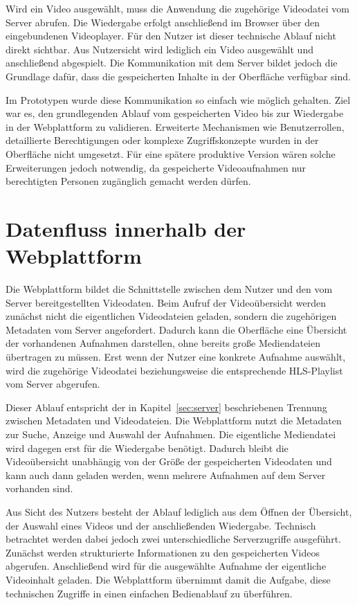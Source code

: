 Wird ein Video ausgewählt, muss die Anwendung die zugehörige Videodatei  vom Server abrufen. Die Wiedergabe erfolgt anschließend im Browser über den eingebundenen Videoplayer. Für den Nutzer ist dieser technische Ablauf nicht direkt sichtbar. 
Aus Nutzersicht wird lediglich ein Video ausgewählt und anschließend abgespielt. Die Kommunikation mit dem Server bildet jedoch die Grundlage dafür, dass die gespeicherten Inhalte in der Oberfläche verfügbar sind. 

Im Prototypen wurde diese Kommunikation so einfach wie möglich gehalten. Ziel war es, den grundlegenden Ablauf vom gespeicherten Video bis zur Wiedergabe in der Webplattform zu validieren. Erweiterte Mechanismen wie Benutzerrollen, 
detaillierte Berechtigungen oder komplexe Zugriffskonzepte wurden in der Oberfläche nicht umgesetzt. Für eine spätere produktive Version wären solche Erweiterungen jedoch notwendig, da gespeicherte Videoaufnahmen nur berechtigten Personen zugänglich gemacht werden dürfen.

\section{Datenfluss innerhalb der Webplattform} 

Die Webplattform bildet die Schnittstelle zwischen dem Nutzer und den vom Server bereitgestellten Videodaten. Beim Aufruf der Videoübersicht werden zunächst nicht die eigentlichen Videodateien geladen, sondern die zugehörigen Metadaten vom Server angefordert. 
Dadurch kann die Oberfläche eine Übersicht der vorhandenen Aufnahmen darstellen, ohne bereits große Mediendateien übertragen zu müssen. Erst wenn der Nutzer eine konkrete Aufnahme auswählt, wird die zugehörige Videodatei beziehungsweise die entsprechende \ac{HLS}-Playlist vom Server abgerufen. 

Dieser Ablauf entspricht der in Kapitel~\ref{sec:server} beschriebenen Trennung zwischen Metadaten und Videodateien. Die Webplattform nutzt die Metadaten zur Suche, Anzeige und Auswahl der Aufnahmen. Die eigentliche Mediendatei wird dagegen erst für die Wiedergabe benötigt. 
Dadurch bleibt die Videoübersicht unabhängig von der Größe der gespeicherten Videodaten und kann auch dann geladen werden, wenn mehrere Aufnahmen auf dem Server vorhanden sind. 

Aus Sicht des Nutzers besteht der Ablauf lediglich aus dem Öffnen der Übersicht, der Auswahl eines Videos und der anschließenden Wiedergabe. Technisch betrachtet werden dabei jedoch zwei unterschiedliche Serverzugriffe ausgeführt. 
Zunächst werden strukturierte Informationen zu den gespeicherten Videos abgerufen. Anschließend wird für die ausgewählte Aufnahme der eigentliche Videoinhalt geladen. Die Webplattform übernimmt damit die Aufgabe, diese technischen Zugriffe in einen einfachen Bedienablauf zu überführen.

